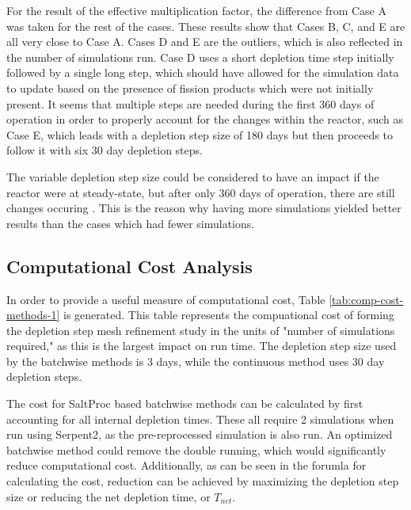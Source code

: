 
For the result of the effective multiplication factor, the difference from Case A was taken for the rest of the cases. These results show that Cases B, C, and E are all very close to Case A. Cases D and E are the outliers, which is also reflected in the number of simulations run. Case D uses a short depletion time step initially followed by a single long step, which should have allowed for the simulation data to update based on the presence of fission products which were not initially present. It seems that multiple steps are needed during the first 360 days of operation in order to properly account for the changes within the reactor, such as Case E, which leads with a depletion step size of 180 days but then proceeds to follow it with six 30 day depletion steps.

The variable depletion step size could be considered to have an impact if the reactor were at steady-state, but after only 360 days of operation, there are still changes occuring \cite{rykhlevskii_advanced_2018}. This is the reason why having more simulations yielded better results than the cases which had fewer simulations.

\subsection{Computational Cost Analysis}

In order to provide a useful measure of computational cost, Table \ref{tab:comp-cost-methods-1} is generated. This table represents the compuational cost of forming the depletion step mesh refinement study in the units of "number of simulations required," as this is the largest impact on run time. The depletion step size used by the batchwise methods is 3 days, while the continuous method uses 30 day depletion steps.

The cost for SaltProc based batchwise methods can be calculated by first accounting for all internal depletion times. These all require 2 simulations when run using Serpent2, as the pre-reprocessed simulation is also run. An optimized batchwise method could remove the double running, which would significantly reduce computational cost. Additionally, as can be seen in the forumla for calculating the cost, reduction can be achieved by maximizing the depletion step size or reducing the net depletion time, or $T_{net}$.

